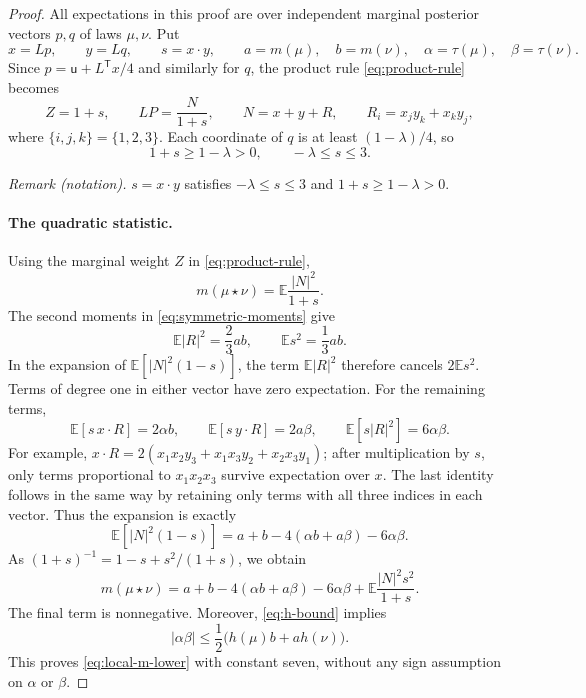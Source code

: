 \documentclass[11pt]{article}
\numberwithin{equation}{section}
\newcommand{\E}{\mathbb E}
\newcommand{\unif}{\mathsf u}
\begin{document}
\begin{proof}
All expectations in this proof are over independent marginal
posterior vectors $p,q$ of laws $\mu,\nu$. Put
\[
 x=Lp,\qquad y=Lq,\qquad s=x\cdot y,
 \qquad a=m(\mu),\quad b=m(\nu),
 \quad \alpha=\tau(\mu),\quad\beta=\tau(\nu).
\]
Since $p=\unif+L^{\mathsf T}x/4$ and similarly for $q$,
the product rule \eqref{eq:product-rule} becomes
\begin{equation}\label{eq:product-coordinates}
 Z=1+s,\qquad LP=\frac{N}{1+s},\qquad
 N=x+y+R,\qquad R_i=x_jy_k+x_ky_j,
\end{equation}
where $\{i,j,k\}=\{1,2,3\}$. Each coordinate of $q$ is at
least $(1-\lambda)/4$, so
\begin{equation}\label{eq:denominator}
 1+s\geq1-\lambda>0,\qquad -\lambda\leq s\leq3.
\end{equation}

\noindent\textit{Remark (notation).} $s=x\cdot y$ satisfies $-\lambda\leq s\leq3$ and $1+s\geq1-\lambda>0$.


\paragraph{The quadratic statistic.}
Using the marginal weight $Z$ in \eqref{eq:product-rule},
\[
 m(\mu\star\nu)=\E\frac{|N|^2}{1+s}.
\]
The second moments in \eqref{eq:symmetric-moments} give
\[
 \E|R|^2=\frac23ab,\qquad \E s^2=\frac13ab.
\]
In the expansion of $\E[|N|^2(1-s)]$, the term
$\E|R|^2$ therefore cancels $2\E s^2$.
Terms of degree one in either vector have zero expectation.
For the remaining terms,
\[
 \E[s\,x\cdot R]=2\alpha b,\qquad
 \E[s\,y\cdot R]=2a\beta,\qquad
 \E[s|R|^2]=6\alpha\beta.
\]
For example,
$x\cdot R=2(x_1x_2y_3+x_1x_3y_2+x_2x_3y_1)$;
after multiplication by $s$, only terms proportional to
$x_1x_2x_3$ survive expectation over $x$. The last identity follows in
the same way by retaining only terms with all three indices in
each vector. Thus the expansion is exactly
\begin{equation}\label{eq:quadratic-cancellation}
 \E[|N|^2(1-s)]
 =a+b-4(\alpha b+a\beta)-6\alpha\beta.
\end{equation}
As $(1+s)^{-1}=1-s+s^2/(1+s)$, we obtain
\begin{equation}\label{eq:exact-m-product}
 m(\mu\star\nu)
 =a+b-4(\alpha b+a\beta)-6\alpha\beta
    +\E\frac{|N|^2s^2}{1+s}.
\end{equation}
The final term is nonnegative. Moreover, \eqref{eq:h-bound}
implies
\[
 |\alpha\beta|\leq
 \frac12\bigl(h(\mu)b+a h(\nu)\bigr).
\]
This proves \eqref{eq:local-m-lower} with constant seven,
without any sign assumption on $\alpha$ or $\beta$.


\end{proof}
\end{document}
